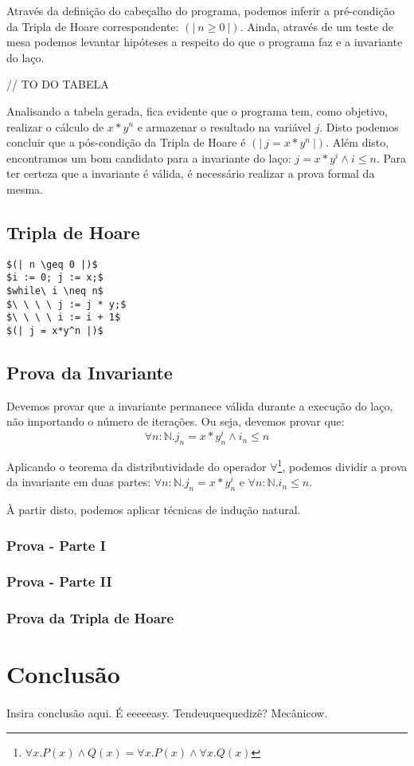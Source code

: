 \documentclass[12pt]{article}
\begin{document}
Através da definição do cabeçalho do programa, podemos inferir a pré-condição da Tripla de Hoare correspondente: $(|\ n \geq 0\ |)$. Ainda, através de um teste de
mesa podemos levantar hipóteses a respeito do que o programa faz e a invariante do laço.

// TO DO TABELA

Analisando a tabela gerada, fica evidente que o programa tem, como objetivo, realizar o cálculo de $x*y^n$ e armazenar o resultado na variável $j$. Disto podemos concluir que a pós-condição
da Tripla de Hoare é $(|\ j = x*y^n\ |)$. Além disto, encontramos um bom candidato para a invariante do laço: $j = x * y^i \land i \leq n$. Para ter certeza que a
invariante é válida, é necessário realizar a prova formal da mesma.

\subsection{Tripla de Hoare}

\begin{lstlisting}
$(| n \geq 0 |)$
$i := 0; j := x;$
$while\ i \neq n$
$\ \ \ \ j := j * y;$
$\ \ \ \ i := i + 1$
$(| j = x*y^n |)$
\end{lstlisting}

\subsection{Prova da Invariante}\label{sec:algo1:invar}
Devemos provar que a invariante permanece válida durante a execução do laço, não importando o número de iterações. Ou seja, devemos provar que:
\[\forall n:\mathds{N}. j_n = x * y^i_n \land i_n \leq n\]

Aplicando o teorema da distributividade do operador $\forall$\footnote{$\forall x.P(x) \land Q(x) = \forall x.P(x) \land \forall x.Q(x)$},
podemos dividir a prova da invariante em duas partes: $\forall n:\mathds{N}. j_n = x * y^i_n$ e $\forall n:\mathds{N}. i_n \leq n$.

À partir disto, podemos aplicar técnicas de indução natural.

\subsubsection{Prova - Parte I}

\subsubsection{Prova - Parte II}

\subsubsection{Prova da Tripla de Hoare}

\section{Conclusão}
\paragraph{}
Insira conclusão aqui.
É eeeeeasy. Tendeuquequedizê? Mecânicow.



\end{document}
